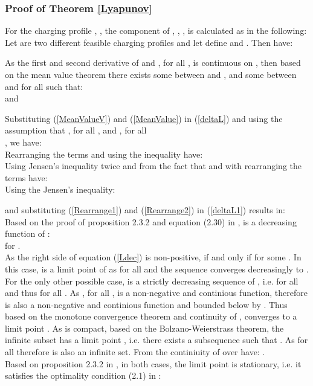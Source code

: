 \documentclass[12pt,draftcls,onecolumn]{IEEEtran}
\begin{document}
\subsubsection{Proof of Theorem \ref{Lyapunov}}\label{A1}
\indent For the charging profile , , the  component of , , , is calculated as in the following:\\

\indent Let  are two different feasible charging profiles and let define  and . Then have:

\indent As the first and second derivative of  and , for all , is continuous on , then based on the mean value theorem there exists some  between  and , and some  between  and  for all  such that:\\

and

Substituting (\ref{MeanValueV}) and (\ref{MeanValue}) in (\ref{deltaL}) and using the assumption that , for all , and , for all \\, we have:\\

Rearranging the terms and using the inequality  have:\\

Using Jensen\rq{}s inequality twice and from the fact that  and  with rearranging the terms have:\\

Using the Jensen\rq{}s inequality:

and substituting (\ref{Rearrange1}) and (\ref{Rearrange2}) in (\ref{deltaL1}) results in:\\

\indent Based on the proof of proposition 2.3.2 and equation (2.30) in \cite{B99},  is a decreasing function of :\\

 for .\\
 \indent As the right side of equation (\ref{Ldec}) is non-positive,  if and only if  for some . In this case,  is a limit point of  as  for all  and the sequence  converges decreasingly to .\\
 \indent For the only other possible case,  is a strictly decreasing sequence of , i.e.  for all  and thus  for all . As , for all , is a non-negative and continious function, therefore  is also a non-negative and continious function and bounded below by . Thus based on the monotone convergence theorem and continuity of ,  converges to a limit point . As  is compact, based on the Bolzano-Weierstrass theorem, the infinite subset  has a limit point , i.e. there exists a subsequence  such that . As  for all  therefore  is also an infinite set. From the continiuity of  over  have: .  \\
 \indent Based on proposition 2.3.2 in \cite{B99}, in both cases, the limit point  is stationary, i.e. it satisfies the optimality condition (2.1) in \cite{B99}:\\
\end{document}
